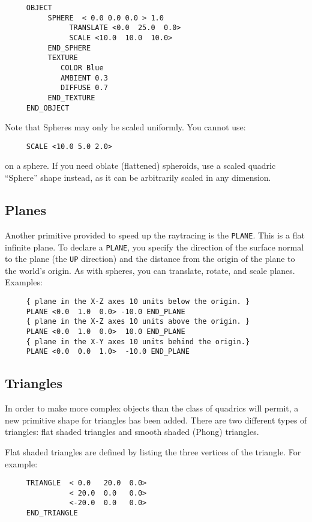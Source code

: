 \begin{verbatim}
     OBJECT
          SPHERE  < 0.0 0.0 0.0 > 1.0
               TRANSLATE <0.0  25.0  0.0> 
               SCALE <10.0  10.0  10.0>
          END_SPHERE
          TEXTURE
             COLOR Blue
             AMBIENT 0.3
             DIFFUSE 0.7
          END_TEXTURE
     END_OBJECT
\end{verbatim}
Note that Spheres may only be scaled uniformly.
You cannot use:
\begin{verbatim}
     SCALE <10.0 5.0 2.0>
\end{verbatim}
on a sphere.  If you need oblate (flattened) spheroids, use a scaled quadric
``Sphere'' shape instead, as it can be arbitrarily scaled in any dimension.

\subsection{Planes}

Another primitive provided to speed up the raytracing is the {\tt PLANE}.
This is a flat infinite plane.  To declare a {\tt PLANE}, you
specify the direction of the surface normal to the plane (the {\tt UP}
direction) and the distance from the origin of the plane to the
world's origin. As with spheres, you can translate, rotate, and scale
planes.  Examples:
\begin{verbatim}
     { plane in the X-Z axes 10 units below the origin. }
     PLANE <0.0  1.0  0.0> -10.0 END_PLANE
     { plane in the X-Z axes 10 units above the origin. }
     PLANE <0.0  1.0  0.0>  10.0 END_PLANE
     { plane in the X-Y axes 10 units behind the origin.}
     PLANE <0.0  0.0  1.0>  -10.0 END_PLANE
\end{verbatim}

\subsection{Triangles}

In order to make more complex objects than the class of quadrics will
permit, a new primitive shape for triangles has been added.  There are
two different types of triangles:  flat shaded triangles and smooth
shaded (Phong) triangles.

Flat shaded triangles are defined by listing the three vertices of the 
triangle.  For example:
\begin{verbatim}
     TRIANGLE  < 0.0   20.0  0.0>
               < 20.0  0.0   0.0>
               <-20.0  0.0   0.0>
     END_TRIANGLE
\end{verbatim}

